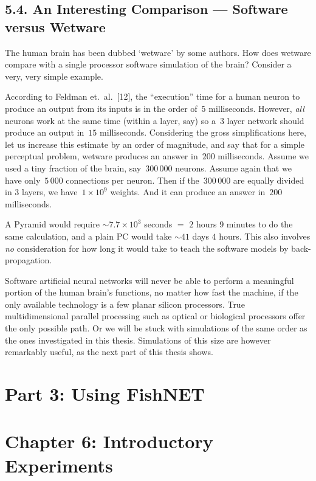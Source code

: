 \documentclass[12pt]{report}
\begin{document}
\section{5.4. An Interesting Comparison --- Software versus Wetware}

The human brain has been dubbed `wetware' by some authors.
How does wetware compare with a single processor software simulation
of the brain?
Consider a very, very simple example.

According to Feldman et.\ al.\ [12], the ``execution'' time for a
human neuron to produce an output from its inputs is in the order
of~$5$ milliseconds.
However, {\sl all} neurons work at the same time (within a layer,
say) so a~$3$ layer network should produce an output in~$15$
milliseconds.
Considering the gross simplifications here, let us increase this
estimate by an order of magnitude, and say that for a simple
perceptual problem, wetware produces an answer in~$200$
milliseconds.
Assume we used a tiny fraction of the brain, say~$300\,000$ neurons.
Assume again that we have only~$5\,000$ connections per neuron.
Then if the~$300\,000$ are equally divided in 3 layers, we
have~$1\times 10^9$ weights.
And it can produce an answer in~$200$ milliseconds.

A Pyramid would require $\sim 7.7 \times 10^3$ seconds $=$ $2$ hours
$9$ minutes to do the same calculation, and a plain PC would take
$\sim 41$ days $4$ hours.
This also involves {\sl no} consideration for how long it would take
to teach the software models by back-propagation.

Software artificial neural networks will never be able to perform a 
meaningful portion
of the human brain's functions, no matter how fast the machine, if
the only available technology is a few planar silicon processors.
True multidimensional parallel processing such as optical or
biological processors offer the only possible path.
Or we will be stuck with simulations of the same order as the ones
investigated in this thesis.
Simulations of this size are however remarkably useful, as the next
part of this thesis shows.


\chapter*{Part 3: Using FishNET}

\chapter{Chapter 6: Introductory Experiments}
\end{document}
